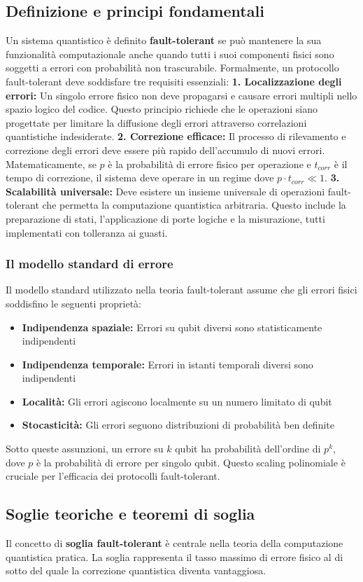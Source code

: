 \documentclass[a4paper,12pt]{report}
\theoremstyle{plain}
\begin{document}
\subsection{Definizione e principi fondamentali}
Un sistema quantistico è definito \textbf{fault-tolerant} se può mantenere la sua funzionalità computazionale anche quando tutti i suoi componenti fisici sono soggetti a errori con probabilità non trascurabile. Formalmente, un protocollo fault-tolerant deve soddisfare tre requisiti essenziali:
\textbf{1. Localizzazione degli errori:} Un singolo errore fisico non deve propagarsi e causare errori multipli nello spazio logico del codice. Questo principio richiede che le operazioni siano progettate per limitare la diffusione degli errori attraverso correlazioni quantistiche indesiderate.
\textbf{2. Correzione efficace:} Il processo di rilevamento e correzione degli errori deve essere più rapido dell'accumulo di nuovi errori. Matematicamente, se $p$ è la probabilità di errore fisico per operazione e $t_{corr}$ è il tempo di correzione, il sistema deve operare in un regime dove $p \cdot t_{corr} \ll 1$.
\textbf{3. Scalabilità universale:} Deve esistere un insieme universale di operazioni fault-tolerant che permetta la computazione quantistica arbitraria. Questo include la preparazione di stati, l'applicazione di porte logiche e la misurazione, tutti implementati con tolleranza ai guasti.
\subsubsection{Il modello standard di errore}
Il modello standard utilizzato nella teoria fault-tolerant assume che gli errori fisici soddisfino le seguenti proprietà:
\begin{itemize}
\item \textbf{Indipendenza spaziale:} Errori su qubit diversi sono statisticamente indipendenti
\item \textbf{Indipendenza temporale:} Errori in istanti temporali diversi sono indipendenti
\item \textbf{Località:} Gli errori agiscono localmente su un numero limitato di qubit
\item \textbf{Stocasticità:} Gli errori seguono distribuzioni di probabilità ben definite
\end{itemize}
Sotto queste assunzioni, un errore su $k$ qubit ha probabilità dell'ordine di $p^k$, dove $p$ è la probabilità di errore per singolo qubit. Questo scaling polinomiale è cruciale per l'efficacia dei protocolli fault-tolerant.
\subsection{Soglie teoriche e teoremi di soglia}
Il concetto di \textbf{soglia fault-tolerant} è centrale nella teoria della computazione quantistica pratica. La soglia rappresenta il tasso massimo di errore fisico al di sotto del quale la correzione quantistica diventa vantaggiosa.
\end{document}
